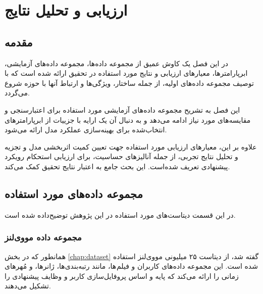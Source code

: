 \chapter{ارزیابی و تحلیل نتایج}
\label{chap:results}
\section{مقدمه} 
در این فصل یک کاوش عمیق از مجموعه داده‌ها، مجموعه داده‌های آزمایشی، ابرپارامترها، معیارهای ارزیابی و نتایج مورد استفاده در تحقیق ارائه شده است که با توصیف مجموعه داده‌های اولیه، از جمله ساختار، ویژگی‌ها و ارتباط آنها با حوزه شروع می‌گردد. 

این فصل به تشریح مجموعه داده‌های آزمایشی مورد استفاده برای اعتبارسنجی و مقایسه‌های مورد نیاز ادامه می‌دهد و به دنبال آن یک ارایه با جزییات از ابرپارامترهای انتخاب‌شده برای بهینه‌سازی عملکرد مدل ارائه می‌شود. 

علاوه بر این، معیارهای ارزیابی مورد استفاده جهت تعیین کمیت اثربخشی مدل و تجزیه و تحلیل نتایج تجربی، از جمله آنالیز‌های حساسیت، برای ارزیابی استحکام رویکرد پیشنهادی تعریف شده‌است. این بحث جامع به اعتبار نتایج تحقیق کمک می‌کند.

\section{مجموعه داده‌های مورد استفاده}
در این قسمت دیتاست‌های مورد استفاده در این پژوهش توضیح‌داده شده است.


\subsection{مجموعه داده مووی‌لنز} 
همانطور که در بخش 
\ref{chap:dataset}
گفته شد، از دیتاست ۲۵ میلیونی مووی‌لنز استفاده شده است. این مجموعه داده‌های کاربران و فیلم ها، مانند رتبه‌بندی‌ها، ژانرها، و مُهرهای زمانی را ارائه می‌کند که پایه و اساس پروفایل‌سازی کاربر و وظایف پیشنهادی را تشکیل می‌دهند.

